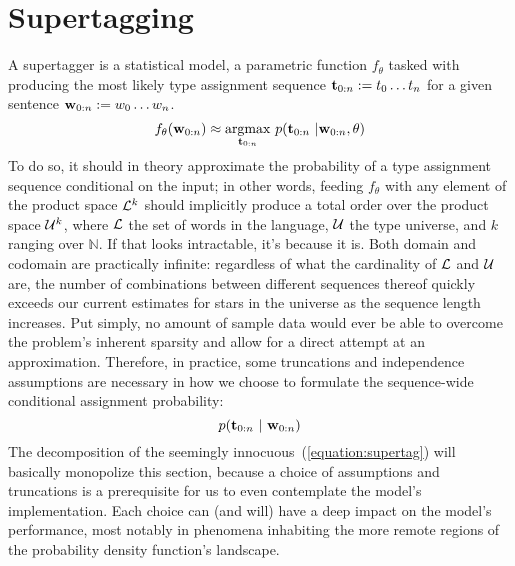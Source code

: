 
\section{Supertagging}
\label{section:supertagging}
A supertagger is a statistical model, a parametric function $f_\theta$ tasked with producing the most likely type assignment sequence $\mathbf{t}_{0:n} := t_0 \dots t_n$ for a given sentence $\mathbf{w}_{0:n} := w_0 \dots w_n$.
\begin{equation}
	f_\theta(\mathbf{w}_{0:n}) \approx \underset{\mathbf{t}_{0:n}}{\mathrm{argmax}} ~ p(\mathbf{t}_{0:n} \ | \mathbf{w}_{0:n}, \theta)
\end{equation}
To do so, it should in theory approximate the probability of a type assignment sequence conditional on the input; in other words, feeding $f_\theta$ with any element of the product space $\mathcal{L}^k$ should implicitly produce a total order over the product space $\mathcal{U}^{k}$, where $\mathcal{L}$ the set of words in the language, $\mathcal{U}$ the type universe, and $k$ ranging over $\mathbb{N}$.
If that looks  intractable, it's because it is.
Both domain and codomain are practically infinite: regardless of what the cardinality of $\mathcal{L}$ and $\mathcal{U}$ are, the number of combinations between different sequences thereof quickly exceeds our current estimates for stars in the universe as the sequence length increases.
Put simply, no amount of sample data would ever be able to overcome the problem's inherent sparsity and allow for a direct attempt at an approximation.
Therefore, in practice, some truncations and independence assumptions are necessary in how we choose to formulate the sequence-wide conditional assignment probability:
\begin{equation}\label{equation:supertag}
p(\mathbf{t}_{0:n} \ | \ \mathbf{w}_{0:n})
\end{equation}
The decomposition of the seemingly innocuous~(\ref{equation:supertag}) will basically monopolize this section, because a choice of assumptions and truncations is a prerequisite for us to even contemplate the model's implementation.
Each choice can (and will) have a deep impact on the model's performance, most notably in phenomena inhabiting the more remote regions of the probability density function's landscape.
